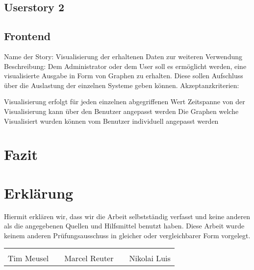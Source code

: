 \subsection{Userstory 2}

\subsection{Frontend}
Name der Story: Visualisierung der erhaltenen Daten zur weiteren Verwendung
Beschreibung: Dem Administrator oder dem User soll es ermöglicht werden, eine
visualisierte Ausgabe in Form von Graphen zu erhalten. Diese sollen Aufschluss
über die Auslastung der einzelnen Systeme geben können.
Akzeptanzkriterien:
\begin{outline}
  \1 Visualisierung erfolgt für jeden einzelnen abgegriffenen Wert
  \1 Zeitspanne von der Visualisierung kann über den Benutzer angepasst werden
  \1 Die Graphen welche Visualisiert wurden können vom Benutzer individuell
  angepasst werden
\end{outline}
\mr%

\section{Fazit}

\printglossaries%

\printbibliography[heading=bibnumbered]

\newpage

\section{Erklärung}
Hiermit erklären wir, dass wir die Arbeit selbstständig verfasst und keine
anderen als die angegebenen Quellen und Hilfsmittel benutzt haben. Diese Arbeit
wurde keinem anderen Prüfungsausschuss in gleicher oder vergleichbarer Form
vorgelegt.

\vfill
{\centering
\renewcommand{\arraystretch}{0.9}
\begin{tabular}{p{}p{}p{}p{}p{}}
  \dotfill                    & & \dotfill                      & & \dotfill \\
  \centering\footnotesize{Tim Meusel}& & \centering\footnotesize{Marcel Reuter}& & \centering\footnotesize{Nikolai Luis}%
\end{tabular}
}

